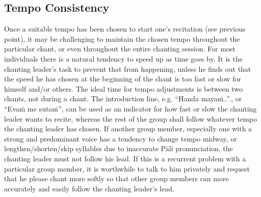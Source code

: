 \subsection*{Tempo Consistency}
\begin{justify}
  Once a suitable tempo has been chosen to start one's recitation (see previous point), it may be challenging to maintain the chosen tempo throughout the particular chant, or even throughout the entire chanting session. For most individuals there is a natural tendency to speed up as time goes by. It is the chanting leader's task to prevent that from happening, unless he finds out that the speed he has chosen at the beginning of the chant is too fast or slow for himself and/or others. The ideal time for tempo adjustments is between two chants, not during a chant. The introduction line, e.g. ``Handa mayaṁ..''., or ``Evaṁ me sutaṁ'', can be used as an indicator for how fast or slow the chanting leader wants to recite, whereas the rest of the group shall follow whatever tempo the chanting leader has chosen. If another group member, especially one with a strong and predominant voice has a tendency to change tempo midway, or lengthen/shorten/skip syllables due to inaccurate Pāli pronunciation, the chanting leader must not follow his lead. If this is a recurrent problem with a particular group member, it is worthwhile to talk to him privately and request that he please chant more softly so that other group members can more accurately and easily follow the chanting leader's lead.
\end{justify}

